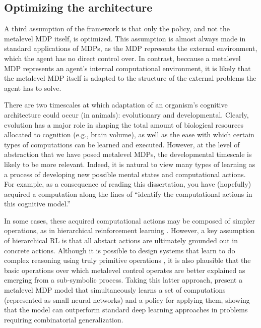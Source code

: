\subsection{Optimizing the architecture}\label{sec:optimize-architecture}

A third assumption of the framework is that only the policy, and not the metalevel MDP itself, is optimized. This assumption is almost always made in standard applications of MDPs, as the MDP represents the external environment, which the agent has no direct control over. In contrast, beccause a metalevel MDP represents an agent's internal computational environment, it is likely that the metalevel MDP itself is adapted to the structure of the external problems the agent has to solve.

There are two timescales at which adaptation of an organism's cognitive architecture could occur (in animals): evolutionary and developmental. Clearly, evolution has a major role in shaping the total amount of biological resources allocated to cognition (e.g., brain volume), as well as the ease with which certain types of computations can be learned and executed. However, at the level of abstraction that we have posed metalevel MDPs, the developmental timescale is likely to be more relevant. Indeed, it is natural to view many types of learning as a process of developing new possible mental states and computational actions. For example, as a consequence of reading this dissertation, you have (hopefully) acquired a computation along the lines of ``identify the computational actions in this cognitive model.''

In some cases, these acquired computational actions may be composed of simpler operations, as in hierarchical reinforcement learning \citep{sutton1999mdps,dietterich2000hierarchical,bacon2016optioncritic}. However, a key assumption of hierarchical RL is that all abstact actions are ultimately grounded out in concrete actions. Although it is possible to design systems that learn to do complex reasoning using truly primitive operations \citep{piantadosi2021computational}, it is also plausible that the basic operations over which metalevel control operates are better explained as emerging from a sub-symbolic process. Taking this latter approach, \citet{chang2019automatically} present a metalevel MDP model that simultaneously learns a set of computations (represented as small neural networks) and a policy for applying them, showing that the model can outperform standard deep learning approaches in problems requiring combinatorial generalization.


